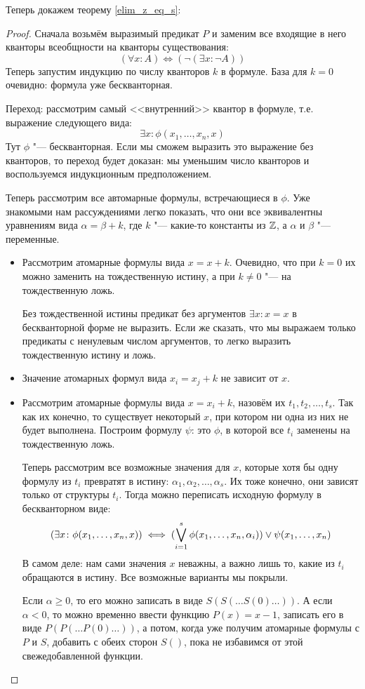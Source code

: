 Теперь докажем теорему \ref{elim_z_eq_s}:
\begin{proof}
	Сначала возьмём выразимый предикат $P$ и заменим все входящие в него кванторы всеобщности на кванторы существования:
	\[ (\forall x \colon A) \iff (\lnot(\exists x \colon \lnot A)) \]
	Теперь запустим индукцию по числу кванторов $k$ в формуле.
	База для $k=0$ очевидно: формула уже бескванторная.

	Переход: рассмотрим самый <<внутренний>> квантор в формуле, т.е. выражение следующего вида:
	\[ \exists x \colon \phi(x_1, \dots, x_n, x) \]
	Тут $\phi$ "--- бескванторная.
	Если мы сможем выразить это выражение без кванторов, то переход будет доказан: мы уменьшим число кванторов и воспользуемся индукционным предположением.

	Теперь рассмотрим все автомарные формулы, встречающиеся в $\phi$.
	Уже знакомыми нам рассуждениями легко показать, что они все эквивалентны уравнениям вида $\alpha = \beta + k$, где $k$ "--- какие-то константы из $\mathbb{Z}$, а $\alpha$ и $\beta$ "--- переменные.
	\begin{itemize}
	\item
		Рассмотрим атомарные формулы вида $x = x + k$.
		Очевидно, что при $k=0$ их можно заменить на тождественную истину, а при $k \neq 0$ "--- на тождественную ложь.
		\begin{Rem}
			Без тождественной истины предикат без аргументов $\exists x \colon x=x$ в бескванторной форме не выразить.
			Если же сказать, что мы выражаем только предикаты с ненулевым числом аргументов, то легко выразить тождественную истину и ложь.
		\end{Rem}
	\item
		Значение атомарных формул вида $x_i = x_j + k$ не зависит от $x$.
	\item
		Рассмотрим атомарные формулы вида $x = x_i + k$, назовём их $t_1, t_2, \dots, t_s$.
		Так как их конечно, то существует некоторый $x$, при котором ни одна из них не будет выполнена.
		Построим формулу $\psi$: это $\phi$, в которой все $t_i$ заменены на тождественную ложь.

		Теперь рассмотрим все возможные значения для $x$, которые хотя бы одну формулу из $t_i$ превратят в истину: $\alpha_1, \alpha_2, \dots, \alpha_s$.
		Их тоже конечно, они зависят только от структуры $t_i$.
		Тогда можно переписать исходную формулу в бескванторном виде:
		\[ (\exists x \colon \phi(x_1, \dots, x_n, x)) \iff (\bigvee_{i=1}^s \phi(x_1, \dots, x_n, \alpha_i)) \lor \psi(x_1, \dots, x_n) \]
		В самом деле: нам сами значения $x$ неважны, а важно лишь то, какие из $t_i$ обращаются в истину.
		Все возможные варианты мы покрыли.
		\begin{Rem}
			Если $\alpha \ge 0$, то его можно записать в виде $S(S(\dots S(0) \dots))$.
			А если $\alpha < 0$, то можно временно ввести функцию $P(x)=x-1$, записать его в виде $P(P(\dots P(0) \dots))$,
			а потом, когда уже получим атомарные формулы с $P$ и $S$, добавить с обеих сторон $S()$, пока не избавимся
			от этой свежедобавленной функции.
		\end{Rem}
	\end{itemize}
\end{proof}
